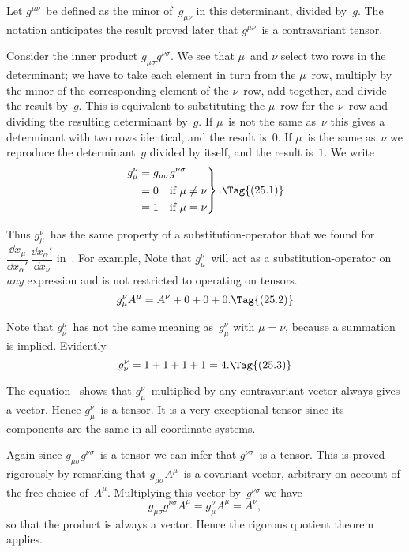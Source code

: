 \documentclass[12pt]{book}
\begin{document}
Let $g^{\mu\nu}$~be defined as the minor of~$g_{\mu\nu}$ in this determinant, divided by~$g$\footnotemark.\footnotetext
  {The notation anticipates the result proved later that $g^{\mu\nu}$~is a contravariant tensor.}

Consider the inner product $g_{\mu\sigma} g^{\nu\sigma}$. We see that $\mu$~and $\nu$ select two rows
in the determinant; we have to take each element in turn from the $\mu$~row,
multiply by the minor of the corresponding element of the $\nu$~row, add
together, and divide the result by~$g$. This is equivalent to substituting the
$\mu$~row for the $\nu$~row and dividing the resulting determinant by~$g$. If $\mu$~is not
the same as~$\nu$ this gives a determinant with two rows identical, and the
result is~$0$. If $\mu$~is the same as~$\nu$ we reproduce the determinant~$g$ divided by
itself, and the result is~$1$. We write
\[
\left.
\begin{aligned}
  g_{\mu}^{\nu} &= g_{\mu\sigma} g^{\nu\sigma} \\
  &= 0 \quad\text{if $\mu \neq \nu$} \\
  &= 1 \quad\text{if $\mu = \nu$}
\end{aligned}
\right\}.
\Tag{(25.1)}
\]

Thus $g_{\mu}^{\nu}$~has the same property of a substitution-operator that we found
%
for $\dfrac{\dd x_{\mu}}{\dd x_{\alpha}'}\, \dfrac{\dd x_{\alpha}'}{\dd x_{\nu}}$ in~. For example\footnotemark,\footnotetext
  {Note that $g_{\mu}^{\nu}$~will act as a substitution-operator on \emph{any} expression and is not restricted to
  operating on tensors.}
\[
g_{\mu}^{\nu} A^{\mu} = A^{\nu} + 0 + 0 + 0.
\Tag{(25.2)}
\]

Note that $g_{\nu}^{\mu}$~has not the same meaning as~$g_{\mu}^{\nu}$ with $\mu = \nu$, because a
summation is implied. Evidently
\[
g_{\nu}^{\nu} = 1 + 1 + 1 +1 = 4.
\Tag{(25.3)}
\]

The equation~ shows that $g_{\mu}^{\nu}$~multiplied by any contravariant vector
always gives a vector. Hence $g_{\mu}^{\nu}$~is a tensor. It is a very exceptional tensor
since its components are the same in all coordinate-systems.

Again since $g_{\mu\sigma}g^{\nu\sigma}$~is a tensor we can infer that $g^{\nu\sigma}$~is a tensor. This is
proved rigorously by remarking that $g_{\mu\sigma} A^{\mu}$~is a covariant vector, arbitrary
on account of the free choice of~$A^{\mu}$. Multiplying this vector by~$g^{\nu\sigma}$ we have
\[
g_{\mu\sigma} g^{\nu\sigma} A^{\mu} = g_{\mu}^{\nu} A^{\mu} = A^{\nu},
\]
so that the product is always a vector. Hence the rigorous quotient theorem
applies.
\end{document}
